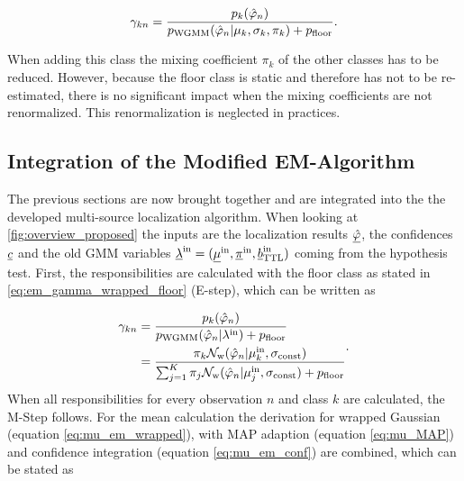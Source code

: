\begin{equation}
\gamma_{kn} = \frac{p_k(\hat{\varphi}_n)}{p_\text{WGMM}(\hat{\varphi}_n| \mu_k,  \sigma_k,  \pi_k)+p_{\text{floor}}}.
\label{eq:em_gamma_wrapped_floor}
\end{equation}

When adding this class the mixing coefficient $\pi_k$ of the other classes has to be reduced. However, because the floor class is static and therefore has not to be re-estimated, there is no significant impact when the mixing coefficients are not renormalized. This renormalization is neglected in practices.

\subsection{Integration of the Modified EM-Algorithm}

The previous sections are now brought together and are integrated into the the developed multi-source localization algorithm. When looking at \ref{fig:overview_proposed} the inputs are the localization results $\underline{\hat{\varphi}}$, the confidences $\underline{c}$ and the old \ac{GMM} variables $\underline{\lambda}^\text{in}= (\underline{\mu}^\text{in}, \underline{\pi}^\text{in}, \underline{b}_\text{TTL}^\text{in})$ coming from the hypothesis test.
First, the responsibilities are calculated with the floor class as stated in \ref{eq:em_gamma_wrapped_floor} (E-step), which can be written as

\begin{equation}
\begin{split}
\gamma_{kn} &= \frac{p_k(\hat{\varphi}_n)}{p_\text{WGMM}(\hat{\varphi}_n| \lambda^\text{in})+p_{\text{floor}}}\\
&= \frac{\pi_k \mathcal{N}_\text{w}(\hat{\varphi}_n|\mu^\text{in}_k,\sigma_\text{const})}{\sum^K_{j=1} \pi_j\mathcal{N}_\text{w}(\hat{\varphi}_n|\mu^\text{in}_j,\sigma_\text{const})+p_{\text{floor}}}
\end{split}.
\label{eq:gamma_final}
\end{equation}
When all responsibilities for every observation $n$ and class $k$ are calculated, the M-Step follows. For the mean calculation the derivation for wrapped Gaussian (equation \ref{eq:mu_em_wrapped}), with MAP adaption (equation \ref{eq:mu_MAP}) and confidence integration (equation \ref{eq:mu_em_conf}) are combined, which can be stated as

